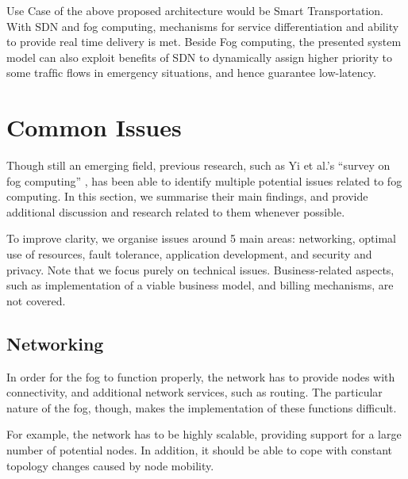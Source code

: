 \documentclass{article}
\begin{document}
Use Case of the above proposed architecture would be 
Smart Transportation. With SDN and fog computing, mechanisms for service differentiation and ability to provide real time delivery is met. Beside Fog computing, the presented system model can also exploit beneﬁts of SDN to dynamically assign higher priority to some trafﬁc ﬂows in emergency situations, and hence guarantee low-latency. 


\pagebreak

\section{Common Issues}

Though still an emerging field, previous research, such as Yi et al.'s ``survey on fog computing'' \cite{yi2015survey}, has been able to identify multiple potential issues related to fog computing. In this section, we summarise their main findings, and provide additional discussion and research related to them whenever possible.

To improve clarity, we organise issues around 5 main areas: networking, optimal use of resources, fault tolerance, application development, and security and privacy. Note that we focus purely on technical issues. Business-related aspects, such as implementation of a viable business model, and billing mechanisms, are not covered.

\subsection{Networking}
In order for the fog to function properly, the network has to provide nodes with connectivity, and additional network services, such as routing. The particular nature of the fog, though, makes the implementation of these functions difficult. 

For example, the network has to be highly scalable, providing support for a large number of potential nodes. In addition, it should be able to cope with constant topology changes caused by node mobility.
\end{document}
